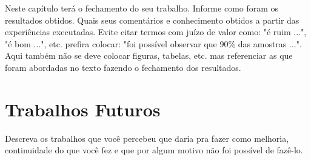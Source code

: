 
\label{Cap:conclusao}

Neste capítulo terá o fechamento do seu trabalho. Informe como foram os resultados obtidos. Quais seus comentários e conhecimento obtidos a partir das experiências executadas. Evite citar termos com juízo de valor como: "é ruim ...", "é bom ...", etc. prefira colocar: "foi possível observar que 90\% das amostras ...". Aqui também não se deve colocar figuras, tabelas, etc. mas referenciar as que foram abordadas no texto fazendo o fechamento dos resultados.

\section{Trabalhos Futuros}
\label{Sec:Trabalhos Futuros}
Descreva os trabalhos que você percebeu que daria pra fazer como melhoria, continuidade do que você fez e que por algum motivo não foi possível de fazê-lo.

